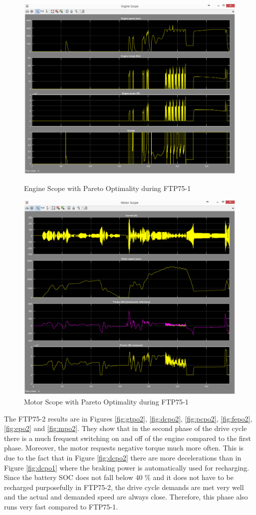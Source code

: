 \begin{figure}[hp]
\centering
\includegraphics[scale=0.37]{figures/Pareto/FTP75-1/engine30Juni}
\caption{Engine Scope with Pareto Optimality during FTP75-1}
\label{fig:epo1}
\includegraphics[scale=0.37]{figures/Pareto/FTP75-1/motor30Juni}
\caption{Motor Scope with Pareto Optimality during FTP75-1}
\label{fig:mpo1}
\end{figure}

The FTP75-2 results are in Figures \ref{fig:gtpo2}, \ref{fig:dcpo2}, \ref{fig:pcpo2}, \ref{fig:fepo2}, \ref{fig:epo2} and \ref{fig:mpo2}. They show that in the second phase of the drive cycle there is a much frequent switching on and off of the engine compared to the first phase. Moreover, the motor requests negative torque much more often. This is due to the fact that in Figure \ref{fig:dcpo2} there are more decelerations than in Figure \ref{fig:dcpo1} where the braking power is automatically used for recharging. Since the battery SOC does not fall below 40 \% and it does not have to be recharged purposefully in FTP75-2, the drive cycle demands are met very well and the actual and demanded speed are always close. Therefore, this phase also runs very fast compared to FTP75-1.

